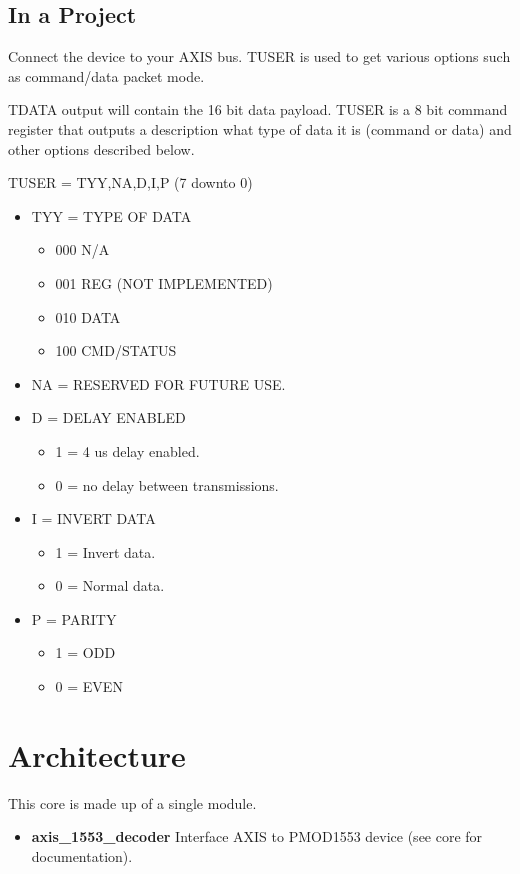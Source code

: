 

\subsection{In a Project}
\par
Connect the device to your AXIS bus. TUSER is used to get various options such as command/data packet mode.

\par
TDATA output will contain the 16 bit data payload. TUSER is a 8 bit command register
that outputs a description what type of data it is (command or data) and other options
described below.

TUSER = {TYY,NA,D,I,P} (7 downto 0)
\begin{itemize}
\item TYY = TYPE OF DATA
  \begin{itemize}
    \item 000 N/A
    \item 001 REG (NOT IMPLEMENTED)
    \item 010 DATA
    \item 100 CMD/STATUS
  \end{itemize}
  \item NA = RESERVED FOR FUTURE USE.
  \item D = DELAY ENABLED
  \begin{itemize}
    \item 1 = 4 us delay enabled.
    \item 0 = no delay between transmissions.
  \end{itemize}
  \item I = INVERT DATA
  \begin{itemize}
    \item 1 = Invert data.
    \item 0 = Normal data.
  \end{itemize}
  \item P = PARITY
  \begin{itemize}
    \item 1 = ODD
    \item 0 = EVEN
  \end{itemize}
\end{itemize}

\section{Architecture}
\par
This core is made up of a single module.
\begin{itemize}
  \item \textbf{axis\_1553\_decoder} Interface AXIS to PMOD1553 device (see core for documentation).
\end{itemize}

